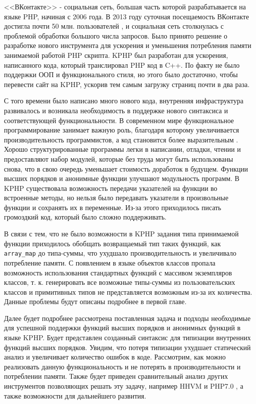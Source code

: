 \startprefacepage
<<ВКонтакте>> - социальная сеть, большая часть которой разрабатывается на языке PHP, начиная с 2006 года.
В 2013 году суточная посещаемость ВКонтакте достигла почти 50 млн. пользователей \cite{kphp-vk-2013}, и социальная сеть столкнулась с проблемой обработки большого числа запросов.
Было принято решение о разработке нового инструмента для ускорения и уменьшения потребления памяти занимаемой работой PHP скрипта.
KPHP был разработан для ускорения, написанного кода, который транслировал PHP код в C++.
По факту не было поддержки ООП и функционального стиля, но этого было достаточно, чтобы перевести сайт на KPHP, ускорив тем самым загрузку страниц почти в два раза.

С того времени было написано много нового кода, внутренняя инфраструктура развивалось и возникала необходимость в поддержке нового синтаксиса и соответствующей функциональности.
В современном мире функциональное программирование занимает важную роль, благодаря которому увеличивается производительность программистов, а код становится более выразительным \cite{fp-matters}.
Хорошо структурированные программы легки в написании, отладки, чтении и предоставляют набор модулей, которые без труда могут быть использованы снова, что в свою очередь уменьшает стоимость доработок в будущем. Функции высших порядков и анонимные функции улучшают модульность программ.
В KPHP существовала возможность передачи указателей на функции во встроенные методы, но нельзя было передавать указатели в произвольные функции и сохранять их в переменные.
Из-за этого приходилось писать громоздкий код, который было сложно поддерживать.

В связи с тем, что не было возможности в KPHP задания типа принимаемой функции приходилось обобщать возвращаемый тип таких функций, как \verb|array_map| до типа-суммы, что ухудшало производительность и увеличивало потребление памяти.
С появлением в языке объектов классов пропала возможность использования стандартных функций с массивом экземпляров классов, т. к. генерировать все возможные типы-суммы из пользовательских классов и примитивных типов не представляется возможным из-за их количества.
Данные проблемы будут описаны подробнее в первой главе.

Далее будет подробнее рассмотрена поставленная задача и подходы необходимые для успешной поддержки функций высших порядков и анонимных функций в языке KPHP.
Будет представлен созданный синтаксис для типизации внутренних функций высших порядков.
Увидим, что потеря типизации ухудшает статический анализ и увеличивает количество ошибок в коде.
Рассмотрим, как можно реализовать данную функциональность и не потерять в производительности и потреблении памяти.
Также будет приведен сравнительный анализ других инструментов позволяющих решать эту задачу, например HHVM \cite{hhvm} и PHP7.0 \cite{php7}, а также возможности для дальнейшего развития.
